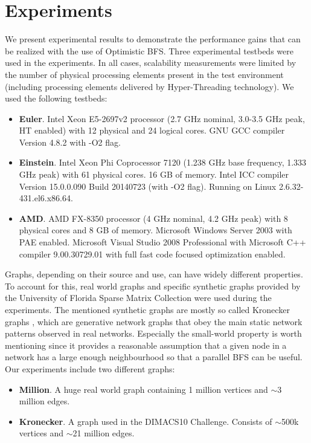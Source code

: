 \documentclass[letterpaper]{article}
\begin{document}
			
	\section{Experiments}\label{sec:expe} %
		We present experimental results to demonstrate the performance gains that can be realized with the use of Optimistic BFS.
		Three experimental testbeds were used in the experiments. 
		In all cases, scalability measurements were limited by the number of physical processing elements present in the test environment (including processing elements delivered by Hyper-Threading technology).
		We used the following testbeds:
		\begin{itemize}
			\item \textbf{Euler}. Intel Xeon E5-2697v2 processor (2.7 GHz nominal, 3.0-3.5 GHz peak, HT enabled) with 12 physical and 24 logical cores. GNU GCC compiler Version 4.8.2 with -O2 flag. 
			\item \textbf{Einstein}. Intel Xeon Phi Coprocessor 7120 (1.238 GHz base frequency, 1.333 GHz peak) with 61 physical cores. 16 GB of memory.
			Intel ICC compiler Version 15.0.0.090 Build 20140723 (with -O2 flag).
			Running on Linux 2.6.32-431.el6.x86.64.
			\item \textbf{AMD}. AMD FX-8350 processor (4 GHz nominal, 4.2 GHz peak) with 8 physical cores and 8 GB of memory. Microsoft Windows Server 2003 with PAE enabled. Microsoft Visual Studio 2008 Professional with  Microsoft C++ compiler 9.00.30729.01 with full fast code focused optimization enabled.
		\end{itemize}

		Graphs, depending on their source and use, can have widely different properties.
		To account for this, real world graphs and specific synthetic graphs provided by the University of Florida Sparse Matrix Collection \cite{SparseMatrixCollection} were used during the experiments.
		The mentioned synthetic graphs are mostly so called Kronecker graphs \cite{Leskovec:2010:KGA:1756006.1756039}, which are generative network graphs that obey the main static network patterns observed in real networks.
		Especially the small-world property is worth mentioning since it provides a reasonable assumption that a given node in a network has a large enough neighbourhood so that a parallel BFS can be useful.		
		Our experiments include two different graphs:
		\begin{itemize}
			\item \textbf{Million}. A huge real world graph containing 1 million vertices and $\sim$3 million edges.
			\item \textbf{Kronecker}. A graph used in the DIMACS10 Challenge. Consists of $\sim$500k vertices and $\sim$21 million edges.
		\end{itemize}
		
\end{document}
